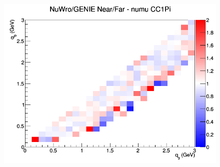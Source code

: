 \documentclass[12pt]{article}
\begin{document}
\begin{figure}[h]
\endminipage
{}
\includegraphics[width=\linewidth]{q0_q3/nominal/ratios/CC1Pi_NuWro_GENIE_numu_NF_q3_q0.png}
\endminipage
\newline
\end{figure}
\clearpage
\end{document}
